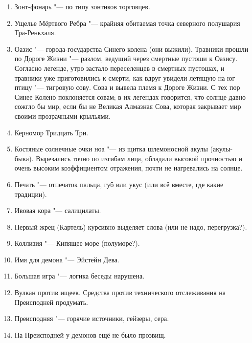 \documentclass[a4paper,10pt]{book}
\begin{document}
\begin{enumerate}

\item Зонт-фонарь "--- по типу зонтиков торговцев.

\item Ущелье Мёртвого Ребра "--- крайняя обитаемая точка северного полушария Тра-Ренкхаля.

\item Оазис "--- города-государства Синего колена (они выжили). Травники прошли по Дороге Жизни "--- разлом, ведущий через смертные пустоши к Оазису. Согласно легенде, утро застало переселенцев в смертных пустошах, и травники уже приготовились к смерти, как вдруг увидели летящую на юг птицу "--- тигровую сову. Сова и вывела племя к Дороге Жизни. С тех пор Синее Колено поклоняется совам; в их легендах говорится, что солнце давно сожгло бы мир, если бы не Великая Алмазная Сова, которая закрывает мир своими прозрачными крыльями.

\item Керномор Тридцать Три.

\item Костяные солнечные очки ноа "--- из щитка шлемоносной акулы (акулы-быка). Вырезались точно по изгибам лица, обладали высокой прочностью и очень высоким коэффициентом отражения, почти не нагревались на солнце.

\item Печать "--- отпечаток пальца, губ или укус (или всё вместе, где какие традиции).

\item Ивовая кора "--- салицилаты.

\item Первый жрец (Картель) курсивно выделяет слова (или не надо, перегрузка?).

\item Коллизия "--- Кипящее море (полуморе?).

\item Имя для демона "--- Эйстейн Дева.

\item Большая игра "--- логика беседы нарушена.

\item Вулкан против ищеек. Средства против технического отслеживания на Преисподней продумать.

\item Преисподняя "--- горячие источники, гейзеры, сера.

\item На Преисподней у демонов ещё не было прозвищ.


\end{enumerate}
\end{document}

